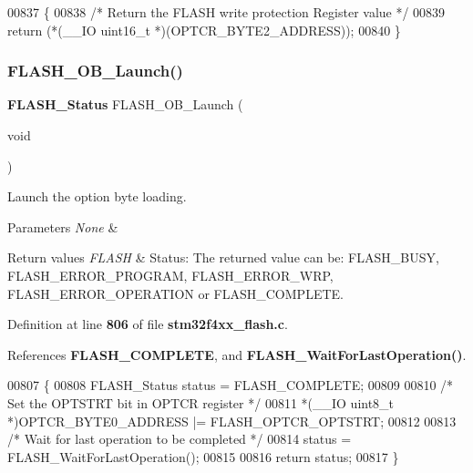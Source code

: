 \begin{DoxyCode}
00837 \{
00838   \textcolor{comment}{/* Return the FLASH write protection Register value */}
00839   \textcolor{keywordflow}{return} (*(\_\_IO uint16\_t *)(OPTCR_BYTE2_ADDRESS));
00840 \}
\end{DoxyCode}
\mbox{\label{group__FLASH_gabcbd44a62a2488d8b90aa8562a258ef1}} 
\subsubsection{F\+L\+A\+S\+H\+\_\+\+O\+B\+\_\+\+Launch()}
{\footnotesize\ttfamily \textbf{ F\+L\+A\+S\+H\+\_\+\+Status} F\+L\+A\+S\+H\+\_\+\+O\+B\+\_\+\+Launch (\begin{DoxyParamCaption}\item[{void}]{ }\end{DoxyParamCaption})}



Launch the option byte loading. 


\begin{DoxyParams}{Parameters}
{\em None} & \\
\hline
\end{DoxyParams}

\begin{DoxyRetVals}{Return values}
{\em F\+L\+A\+SH} & Status\+: The returned value can be\+: F\+L\+A\+S\+H\+\_\+\+B\+U\+SY, F\+L\+A\+S\+H\+\_\+\+E\+R\+R\+O\+R\+\_\+\+P\+R\+O\+G\+R\+AM, F\+L\+A\+S\+H\+\_\+\+E\+R\+R\+O\+R\+\_\+\+W\+RP, F\+L\+A\+S\+H\+\_\+\+E\+R\+R\+O\+R\+\_\+\+O\+P\+E\+R\+A\+T\+I\+ON or F\+L\+A\+S\+H\+\_\+\+C\+O\+M\+P\+L\+E\+TE. \\
\hline
\end{DoxyRetVals}


Definition at line \textbf{ 806} of file \textbf{ stm32f4xx\+\_\+flash.\+c}.



References \textbf{ F\+L\+A\+S\+H\+\_\+\+C\+O\+M\+P\+L\+E\+TE}, and \textbf{ F\+L\+A\+S\+H\+\_\+\+Wait\+For\+Last\+Operation()}.


\begin{DoxyCode}
00807 \{
00808   FLASH_Status status = FLASH_COMPLETE;
00809 
00810   \textcolor{comment}{/* Set the OPTSTRT bit in OPTCR register */}
00811   *(\_\_IO uint8\_t *)OPTCR_BYTE0_ADDRESS |= FLASH_OPTCR_OPTSTRT;
00812 
00813   \textcolor{comment}{/* Wait for last operation to be completed */}
00814   status = FLASH_WaitForLastOperation();
00815 
00816   \textcolor{keywordflow}{return} status;
00817 \}
\end{DoxyCode}
\mbox{\label{group__FLASH_ga63a33d9af7e29b64c3806e5505c59b74}} 
